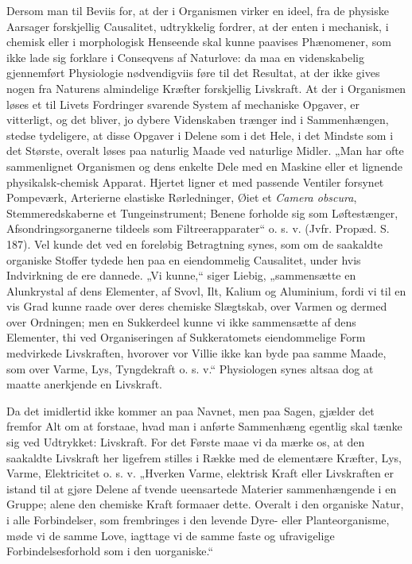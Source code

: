 \documentclass[12pt,a4paper]{book}
\begin{document}
\setcounter{footnote}{0}
Dersom man til Beviis for, at der i Organismen virker en ideel, fra
de physiske Aarsager forskjellig Causalitet, udtrykkelig fordrer, at
der enten i mechanisk, i chemisk eller i morphologisk Henseende skal
kunne paavises Phænomener, som ikke lade sig forklare i Conseqvens
af Naturlove: da maa en videnskabelig gjennemført Physiologie
nødvendigviis føre til det Resultat, at der ikke gives nogen fra
Naturens almindelige Kræfter forskjellig Livskraft. At der i
Organismen løses et til Livets Fordringer svarende System af
mechaniske Opgaver, er vitterligt, og det bliver, jo dybere
Videnskaben trænger ind i Sammenhængen, stedse tydeligere, at disse
Opgaver i Delene som i det Hele, i det Mindste som i det Største,
overalt løses paa naturlig Maade ved naturlige Midler. „Man har ofte
sammenlignet Organismen og dens enkelte Dele med en Maskine eller et
lignende physikalsk-chemisk Apparat. Hjertet ligner et med passende
Ventiler forsynet Pompeværk, Arterierne elastiske Rørledninger,
Øiet et \textit{Camera obscura}, Stemmeredskaberne et
Tungeinstrument; Benene forholde sig som Løftestænger,
Afsondringsorganerne tildeels som Filtreerapparater“ o. s. v. (Jvfr.
Propæd. S. 187).
Vel kunde det ved en foreløbig Betragtning synes, som om de
saakaldte organiske Stoffer tydede hen paa en eiendommelig
Causalitet, under hvis Indvirkning de ere dannede. „Vi kunne,“ siger
Liebig, „sammensætte en Alunkrystal af dens Elementer, af Svovl,
Ilt, Kalium og Aluminium, fordi vi til en vis Grad kunne raade over
deres chemiske Slægtskab, over Varmen og dermed over Ordningen; men
en Sukkerdeel kunne vi ikke sammensætte af dens Elementer, thi ved
Organiseringen af Sukkeratomets eiendommelige Form medvirkede
Livskraften, hvorover vor Villie ikke kan byde paa samme Maade, som
over Varme, Lys, Tyngdekraft o. s. v.“ Physiologen synes altsaa dog
at maatte anerkjende en Livskraft.

Da det imidlertid ikke kommer an paa Navnet, men paa Sagen, gjælder
det fremfor Alt om at forstaae, hvad man i anførte Sammenhæng
egentlig skal tænke sig ved Udtrykket: Livskraft. For det Første
maae vi da mærke os, at den saakaldte Livskraft her ligefrem stilles
i Række med de elementære Kræfter, Lys, Varme, Elektricitet o. s. v.
„Hverken Varme, elektrisk Kraft eller Livskraften er istand til at
gjøre Delene af tvende ueensartede Materier sammenhængende i en
Gruppe; alene den chemiske Kraft formaaer dette. Overalt i den
organiske Natur, i alle Forbindelser, som frembringes i den levende
Dyre- eller Planteorganisme, møde vi de samme Love, iagttage vi de
samme faste og ufravigelige Forbindelsesforhold som i den
uorganiske.“
\end{document}

